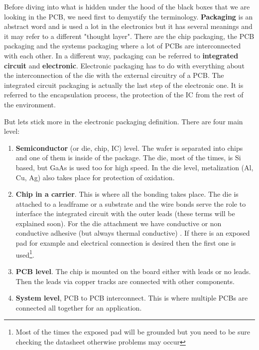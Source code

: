 \documentclass[final]{cubedoc}
\begin{document}
Before diving into what is hidden under the hood of the black boxes that we are looking in the PCB, we need first to demystify the terminology. \textbf{Packaging} is an abstract word and is used a lot in the electronics but it has several meanings and it may refer to a different "thought layer". There are the chip packaging, the PCB packaging and the systems packaging where a lot of PCBs are interconnected with each other. In a different way, packaging can be referred to \textbf{integrated circuit} and \textbf{electronic}. Electronic packaging has to do with everything about the interconnection of the die with the external circuitry of a PCB. The integrated circuit packaging is actually the last step of the electronic one. It is referred to the encapsulation process, the protection of the IC from the rest of the environment.

But lets stick more in the electronic packaging definition. There are four main level:

\begin{enumerate}
    \item \textbf{Semiconductor} (or die, chip, IC) level. The wafer is separated into chips and one of them is inside of the package. The die, most of the times, is Si based, but GaAs is used too for high speed. In the die level, metalization (Al, Cu, Ag) also takes place for protection of oxidation.
    \item \textbf{Chip in a carrier}. This is where all the bonding takes place. The die is attached to a leadframe or a substrate  and the wire bonds serve the role to interface the integrated circuit with the outer leads (these terms will be explained soon). For the die attachment we have conductive or non conductive adhesive (but always thermal conductive) . If there is an exposed pad for example and electrical connection is desired then the first one is used\footnote{Most of the times the exposed pad will be grounded but you need to be sure checking the datasheet otherwise problems may occur}. 
    \item \textbf{PCB level}. The chip is mounted on the board either with leads or no leads. Then the leads via copper tracks are connected with other components.
    \item \textbf{System level}, PCB to PCB interconnect. This is where multiple PCBs are connected all together for an application.
\end{enumerate}
\end{document}
